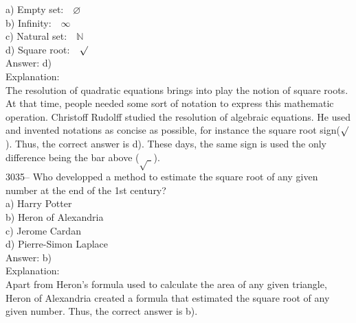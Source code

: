 \documentclass[letterpaper, 12pt]{article}
\begin{document}
a) Empty set:\ \ $\varnothing$\\
b) Infinity:\ \ $\infty$\\
c) Natural set:\ \ $\mathbb{N}$\\
d) Square root:\ \ $\surd$\\

Answer: d)\\

Explanation:\\
The resolution of quadratic equations brings into play the notion of square roots. At that time, people needed some sort of notation to express this mathematic operation. Christoff Rudolff studied the resolution of algebraic equations. He used and invented notations as concise as possible, for instance the square root sign($\surd$). Thus, the correct answer is d). These days, the same sign is used the only difference being the bar above ($\sqrt{ \ \ }$).\\



3035-- Who developped a method to estimate the square root of any given number at the end of the 1st century?\\

a) Harry Potter\\
b) Heron of Alexandria\\
c) Jerome Cardan\\
d) Pierre-Simon Laplace\\

Answer: b)\\

Explanation:\\
Apart from Heron's formula used to calculate the area of any given triangle, Heron of Alexandria created a formula that estimated the square root of any given number. Thus, the correct answer is b).\\



\end{document}
